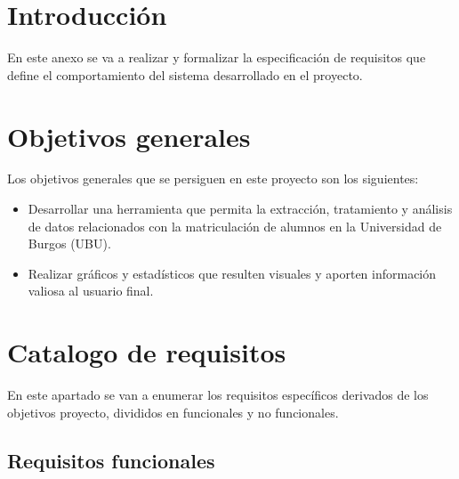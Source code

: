 
\section{Introducción}

En este anexo se va a realizar y formalizar la especificación de requisitos que define el comportamiento del sistema desarrollado en el proyecto.

\section{Objetivos generales}

Los objetivos generales que se persiguen en este proyecto son los siguientes:

\begin{itemize}
\item
Desarrollar una herramienta que permita la extracción, tratamiento y análisis de datos relacionados con la matriculación de alumnos en la Universidad de Burgos (UBU). 
\item
Realizar gráficos y estadísticos que resulten visuales y aporten información valiosa al usuario final. 
\end{itemize}


\section{Catalogo de requisitos}

En este apartado se van a enumerar los requisitos específicos derivados de los objetivos proyecto, divididos en funcionales y no funcionales.

\subsection{Requisitos funcionales}

